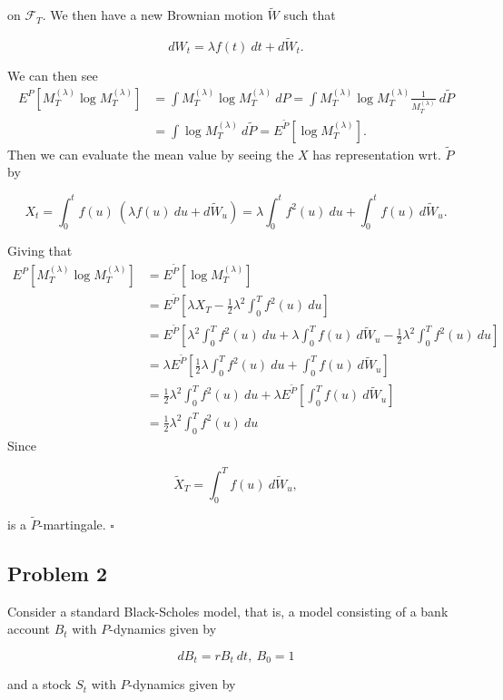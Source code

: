 \documentclass[a4paper,12pt,openany]{book}
\begin{document}
on \(\mathcal{F}_T\). We then have a new Brownian motion \(\tilde{W}\) such that

\[
dW_t=\lambda f(t)\ dt + d\tilde{W}_t.
\]

We can then see
\begin{align*}
E^P[M_T^{(\lambda)}\log M_T^{(\lambda)}]&=\int M_T^{(\lambda)}\log M_T^{(\lambda)}\ dP=\int M_T^{(\lambda)}\log M_T^{(\lambda)} \frac{1}{M_T^{(\lambda)}}\ d\tilde{P}\\
&=\int \log M_T^{(\lambda)}\ d\tilde{P}=E^{\tilde{P}}[\log M_T^{(\lambda)}].
\end{align*}
Then we can evaluate the mean value by seeing the \(X\) has representation wrt. \(\tilde{P}\) by

\[
X_t=\int_0^tf(u)\ (\lambda f(u)\ du + d\tilde{W}_u)=\lambda\int_0^tf^2(u)\ du+\int_0^tf(u)\ d\tilde{W}_u.
\]

Giving that
\begin{align*}
E^P[M_T^{(\lambda)}\log M_T^{(\lambda)}]&=E^{\tilde{P}}[\log M_T^{(\lambda)}]\\
&=E^{\tilde{P}}\left[ \lambda X_T-\frac{1}{2}\lambda ^2\int_0^T f^2(u)\ du \right]\\
&=E^{\tilde{P}}\left[ \lambda^2\int_0^Tf^2(u)\ du+\lambda\int_0^Tf(u)\ d\tilde{W}_u-\frac{1}{2}\lambda ^2\int_0^T f^2(u)\ du \right]\\
&=\lambda E^{\tilde{P}}\left[\frac{1}{2} \lambda\int_0^Tf^2(u)\ du+\int_0^Tf(u)\ d\tilde{W}_u \right]\\
&=\frac{1}{2} \lambda^2\int_0^Tf^2(u)\ du+\lambda E^{\tilde{P}}\left[\int_0^Tf(u)\ d\tilde{W}_u \right]\\
&=\frac{1}{2} \lambda^2\int_0^Tf^2(u)\ du
\end{align*}
Since

\[
\tilde{X}_T=\int_0^Tf(u)\ d\tilde{W}_u,
\]

is a \(\tilde{P}\)-martingale. \(\square\)

\noindent\makebox[\linewidth]{\rule{\textwidth}{0.4pt}}

\hypertarget{problem-2}{%
\subsection{Problem 2}\label{problem-2}}

Consider a standard Black-Scholes model, that is, a model consisting of a bank account \(B_t\) with \(P\)-dynamics given by

\[
dB_t=rB_t\ dt,\ B_0=1
\]

and a stock \(S_t\) with \(P\)-dynamics given by
\end{document}
